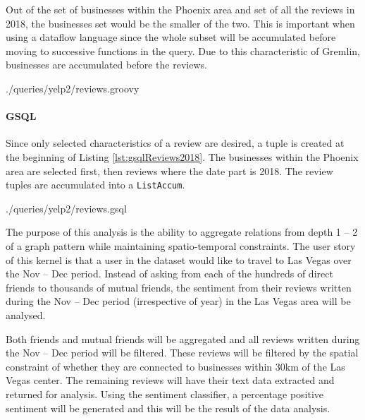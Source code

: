 Out of the set of businesses within the Phoenix area and set of all the reviews in 2018, the businesses set would be the smaller of the two. This is important when using a dataflow language since the whole subset will be accumulated before moving to successive functions in the query. Due to this characteristic of Gremlin, businesses are accumulated before the reviews.


{./queries/yelp2/reviews.groovy}

\paragraph{GSQL}

Since only selected characteristics of a review are desired, a tuple is created at the beginning of Listing \ref{lst:gsqlReviews2018}. The businesses within the Phoenix area are selected first, then reviews where the date part is 2018. The review tuples are accumulated into a \texttt{ListAccum}.


{./queries/yelp2/reviews.gsql}


The purpose of this analysis is the ability to aggregate relations from depth 1 -- 2 of a graph pattern while maintaining spatio-temporal constraints. The user story of this kernel is that a user in the dataset would like to travel to Las Vegas over the Nov -- Dec period. Instead of asking from each of the hundreds of direct friends to thousands of mutual friends, the sentiment from their reviews written during the Nov -- Dec period (irrespective of year) in the Las Vegas area will be analysed.

Both friends and mutual friends will be aggregated and all reviews written during the Nov -- Dec period will be filtered. These reviews will be filtered by the spatial constraint of whether they are connected to businesses within 30km of the Las Vegas center. The remaining reviews will have their text data extracted and returned for analysis. Using the sentiment classifier, a percentage positive sentiment will be generated and this will be the result of the data analysis.
